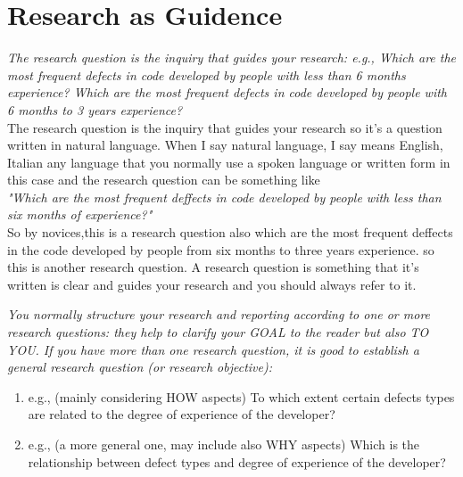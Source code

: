 \documentclass[conference, compsoc, twoside]{IEEEtran}
\begin{document}
\section{Research as Guidence} %
\label{sec:research_as_guidence}
\textit{The research question is the inquiry that guides your research: e.g., Which are the most frequent defects in code developed by people with less than 6 months experience? Which are the most frequent defects in code developed by people with 6 months to 3 years experience? }\\
The research question is the inquiry that guides your research so it's a question written in natural language. When I say natural language, I say means English, Italian any language that you normally use a spoken language or written form in this case and the research question can be something like \\
\textit{"Which are the most frequent deffects in code developed by people with less than six months of experience?"}\\
So by novices,this is a research question also which are the most frequent deffects in the code developed by people from six months to three years experience. 
so this is another research question.
A research question is something that it's written is clear and guides your research and you should always refer to it. 

\textit{You normally structure your research and reporting according to one or more research questions: they help to clarify your GOAL to the reader but also TO YOU.
If you have more than one research question, it is good to establish a general research question (or research objective):}
\begin{enumerate}
	\item e.g., (mainly considering HOW aspects) To which extent certain defects types are related to the degree of experience of the developer?
	\item e.g., (a more general one, may include also WHY aspects) Which is the relationship between defect types and degree of experience of the developer?
\end{enumerate}
\end{document}
